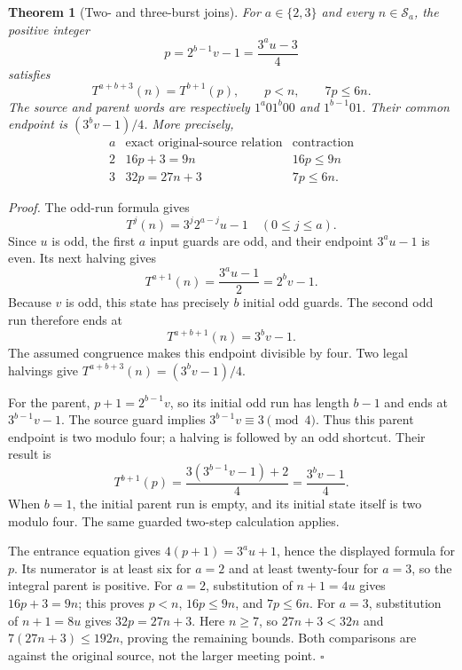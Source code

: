 \documentclass[11pt,letterpaper]{article}
\newtheorem{theorem}{Theorem}
\newenvironment{proof}{\noindent\textit{Proof.}}{\hfill\(\square\)}
\begin{document}
\begin{theorem}[Two- and three-burst joins]
For \(a\in\{2,3\}\) and every \(n\in\mathcal S_a\), the positive integer
\[
p=2^{b-1}v-1=\frac{3^a u-3}{4}
\]
satisfies
\[
T^{a+b+3}(n)=T^{b+1}(p),\qquad p<n,\qquad 7p\le6n.
\]
The source and parent words are respectively \(1^a01^b00\) and
\(1^{b-1}01\). Their common endpoint is \((3^b v-1)/4\).
More precisely,
\[
\begin{array}{c|c|c}
a&\text{exact original-source relation}&\text{contraction}\\
\hline
2&16p+3=9n&16p\le9n\\
3&32p=27n+3&7p\le6n.
\end{array}
\]
\end{theorem}
\begin{proof}
The odd-run formula gives
\[
T^j(n)=3^j2^{a-j}u-1\quad(0\le j\le a).
\]
Since \(u\) is odd, the first \(a\) input guards are odd, and their
endpoint \(3^a u-1\) is even. Its next halving gives
\[
T^{a+1}(n)=\frac{3^a u-1}{2}=2^b v-1.
\]
Because \(v\) is odd, this state has precisely \(b\) initial odd guards.
The second odd run therefore ends at
\[
T^{a+b+1}(n)=3^b v-1.
\]
The assumed congruence makes this endpoint divisible by four.
Two legal halvings give \(T^{a+b+3}(n)=(3^b v-1)/4\).

For the parent, \(p+1=2^{b-1}v\), so its initial odd run has length
\(b-1\) and ends at \(3^{b-1}v-1\).
The source guard implies \(3^{b-1}v\equiv3\pmod4\).
Thus this parent endpoint is two modulo four; a halving is followed by
an odd shortcut. Their result is
\[
T^{b+1}(p)=\frac{3(3^{b-1}v-1)+2}{4}
         =\frac{3^b v-1}{4}.
\]
When \(b=1\), the initial parent run is empty, and its initial state
itself is two modulo four. The same guarded two-step calculation applies.

The entrance equation gives \(4(p+1)=3^a u+1\), hence the displayed
formula for \(p\). Its numerator is at least six for \(a=2\) and
at least twenty-four for \(a=3\), so the integral parent is positive.
For \(a=2\), substitution of \(n+1=4u\) gives \(16p+3=9n\);
this proves \(p<n\), \(16p\le9n\), and \(7p\le6n\).
For \(a=3\), substitution of \(n+1=8u\) gives \(32p=27n+3\).
Here \(n\ge7\), so \(27n+3<32n\) and
\(7(27n+3)\le192n\), proving the remaining bounds.
Both comparisons are against the original source, not the larger
meeting point.
\end{proof}
\end{document}
